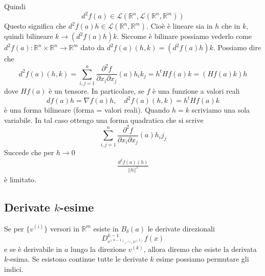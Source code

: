 \documentclass[a4paper]{article}
\begin{document}

Quindi
\[
    d^2f(a) \in \mathcal{L}(\mathbb{R}^n, \mathcal{L}(\mathbb{R}^n, \mathbb{R}^m))
\]
Questo significa che \(d^2f(a) h \in \mathcal{L}(\mathbb{R}^n, \mathbb{R}^m)\).
Cioè è lineare sia in \(h\) che in \(k\), quindi bilineare
\(k \to (d^2f(a)h)k\).
Siccome è bilinare possiamo vederlo come \(d^2f(a) \colon \mathbb{R}^n \times \mathbb{R}^n \to \mathbb{R}^m\)
dato da \(d^2f(a)(h,k) = (d^2f(a)h)k\).
Possiamo dire che
\[
    d^2f(a)(h,k) = \sum_{i,j=1}^n \frac{\partial^2 f}{\partial x_i \partial x_j}(a)h_ik_j
    = h^t Hf(a) k = (Hf(a)k)h
\]
dove \(Hf(a)\) è un tensore.
In particolare, se \(f\) è una funzione a valori reali
\[
    df(a) h = \nabla f(a) h, \quad
    d^2f(a)(h,k) = h^t Hf(a) k
\]
è una forma bilineare (forma = valori reali).
Quando \(h=k\) scriviamo una sola variabile.
In tal caso ottengo una forma quadratica che si scrive
\[
    \sum_{i,j=1}^n \frac{\partial^2 f}{\partial x_i \partial x_j}(a)h_ij_j    
\]
Succede che per \(h \to 0\)
\begin{align*}
    \frac{d^2f(a)(h)}{||h||^2}
\end{align*}
è limitato.


\subsection{Derivate \(k\)-esime}

Se per \(\{v^{(i)}\}\) versori in \(\mathbb{R}^m\)
esiste in \(B_\delta(a)\) le derivate direzionali
\[
    D_{v^{(k-1)}, \cdots, v^{(1)}}^{k-1}f(x)
\]
e se è derivabile in \(a\) lungo la direzione \(v^{(k)}\),
allora diremo che esiste la derivata \(k\)-esima.
Se esistono continue tutte le derivate \(k\) esime possiamo permutare gli indici.

\end{document}
